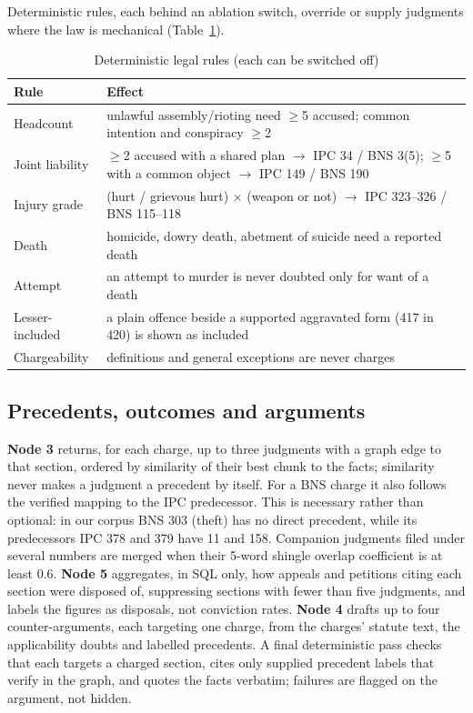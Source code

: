 \documentclass[conference]{IEEEtran}
\begin{document}
Deterministic rules, each behind an ablation switch, override or supply judgments where the law is mechanical (Table~\ref{tab:rules}).

\begin{table}[t]
\caption{Deterministic legal rules (each can be switched off)}
\label{tab:rules}
\centering
\small
\begin{tabular}{p{}p{}}
\toprule
Rule & Effect\\
\midrule
Headcount & unlawful assembly/rioting need $\geq$5 accused; common intention and conspiracy $\geq$2\\
Joint liability & $\geq$2 accused with a shared plan $\rightarrow$ IPC 34 / BNS 3(5); $\geq$5 with a common object $\rightarrow$ IPC 149 / BNS 190\\
Injury grade & (hurt / grievous hurt) $\times$ (weapon or not) $\rightarrow$ IPC 323--326 / BNS 115--118\\
Death & homicide, dowry death, abetment of suicide need a reported death\\
Attempt & an attempt to murder is never doubted only for want of a death\\
Lesser-included & a plain offence beside a supported aggravated form (417 in 420) is shown as included\\
Chargeability & definitions and general exceptions are never charges\\
\bottomrule
\end{tabular}
\end{table}

\subsection{Precedents, outcomes and arguments}\label{sec:precedent}
\textbf{Node 3} returns, for each charge, up to three judgments with a graph edge to that section, ordered by similarity of their best chunk to the facts; similarity never makes a judgment a precedent by itself. For a BNS charge it also follows the verified mapping to the IPC predecessor. This is necessary rather than optional: in our corpus BNS 303 (theft) has no direct precedent, while its predecessors IPC 378 and 379 have 11 and 158. Companion judgments filed under several numbers are merged when their 5-word shingle overlap coefficient is at least 0.6.
\textbf{Node 5} aggregates, in SQL only, how appeals and petitions citing each section were disposed of, suppressing sections with fewer than five judgments, and labels the figures as disposals, not conviction rates.
\textbf{Node 4} drafts up to four counter-arguments, each targeting one charge, from the charges' statute text, the applicability doubts and labelled precedents. A final deterministic pass checks that each targets a charged section, cites only supplied precedent labels that verify in the graph, and quotes the facts verbatim; failures are flagged on the argument, not hidden.
\end{document}
